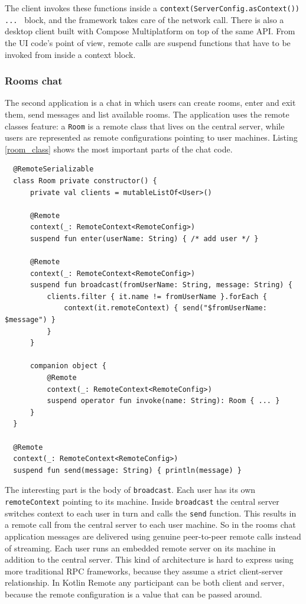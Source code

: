 \documentclass[a4paper,11pt,oneside]{article}
\newcommand{\kotlini}[1]{\texttt{#1}}
\begin{document}
The client invokes these functions inside a \kotlini{context(ServerConfig.asContext()) { ... }} block,
and the framework takes care of the network call. There is also a desktop client built with Compose
Multiplatform on top of the same API. From the UI code's point of view, remote calls are suspend
functions that have to be invoked from inside a context block.

\subsubsection{Rooms chat}

The second application is a chat in which users can create rooms, enter and exit them, send
messages and list available rooms. The application uses the remote classes
feature: a \kotlini{Room} is a remote class that lives on the central server, while users
are represented as remote configurations pointing to user machines. Listing \ref{room_class} shows
the most important parts of the chat code.

\begin{listing}[!h]
  \begin{verbatim}
  @RemoteSerializable
  class Room private constructor() {
      private val clients = mutableListOf<User>()

      @Remote
      context(_: RemoteContext<RemoteConfig>)
      suspend fun enter(userName: String) { /* add user */ }

      @Remote
      context(_: RemoteContext<RemoteConfig>)
      suspend fun broadcast(fromUserName: String, message: String) {
          clients.filter { it.name != fromUserName }.forEach {
              context(it.remoteContext) { send("$fromUserName: $message") }
          }
      }

      companion object {
          @Remote
          context(_: RemoteContext<RemoteConfig>)
          suspend operator fun invoke(name: String): Room { ... }
      }
  }

  @Remote
  context(_: RemoteContext<RemoteConfig>)
  suspend fun send(message: String) { println(message) }
  \end{verbatim}
  \caption{Rooms chat: \kotlini{Room} class and \kotlini{send} function}\label{room_class}
\end{listing}

The interesting part is the body of \kotlini{broadcast}. Each user has its own
\kotlini{remoteContext} pointing to its machine. Inside \kotlini{broadcast} the central server
switches context to each user in turn and calls the \kotlini{send} function. This results in a remote
call from the central server to each user machine. So in the rooms chat application messages are
delivered using genuine peer-to-peer remote calls instead of streaming. Each user runs an embedded
remote server on its machine in addition to the central server. This kind of architecture is hard
to express using more traditional RPC frameworks, because they assume a strict client-server
relationship. In Kotlin Remote any participant can be both client and server, because the remote
configuration is a value that can be passed around.
\end{document}
